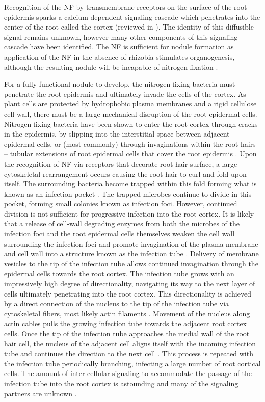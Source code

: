Recognition of the NF by transmembrane receptors on the surface of
the root epidermis sparks a calcium-dependent signaling cascade which penetrates
into the center of the root called the cortex (reviewed in
\citet{Oldroyd:2004dv, Oldroyd:2008hd}). The identity of this diffusible signal
remains unknown, however many other components of this signaling cascade have
been identified. The NF is sufficient for
nodule formation as application of the NF in the absence of rhizobia stimulates
organogenesis, although the resulting nodule will be incapable of nitrogen
fixation \cite{Truchet:1991tu}. 

For a fully-functional nodule to develop, the nitrogen-fixing bacteria 
must penetrate the root epidermis and ultimately invade the cells of the cortex.
As plant cells are protected by hydrophobic plasma membranes and a rigid
cellulose cell wall, there must be a large mechanical disruption of the root
epidermal cells. Nitrogen-fixing bacteria have been shown to enter the root
cortex through cracks in the epidermis, by slipping into the interstitial space
between adjacent epidermal cells, or (most commonly) through invaginations
within the root hairs -- tubular extensions of root epidermal cells that cover the
root
epidermis \cite{Oldroyd:2011ej, Gage:2004ee, Grierson:2002jf}. Upon the
recognition of NF via receptors that decorate root hair surface, a
large cytoskeletal rearrangement occurs causing the root hair to curl and fold upon
itself. The surrounding bacteria become trapped within this fold
forming what is known as an infection pocket \cite{Geurts:2005jx}. The trapped
microbes continue to divide in this pocket, forming small colonies known as
infection foci. However, continued division is not sufficient for
progressive infection into the root cortex. It is likely that a release of
cell-wall degrading enzymes from both the microbes of the infection foci and the
root epidermal cells themselves weaken the cell wall surrounding the infection
foci and
promote invagination of the plasma membrane and cell wall into a structure known as the
infection tube \cite{Ridge:1985wo}. Delivery of membrane vesicles to the tip of
the infection tube allows continued invagination through the epidermal cells
towards the root cortex. The
infection tube grows with an impressively high degree of directionality,
navigating its way to the next
layer of cells ultimately penetrating into the root cortex. This directionality
is achieved by a direct connection of the nucleus to the tip of the infection tube
via cytoskeletal fibers, most likely actin filaments
\cite{MonahanGiovanelli:2006ki}. Movement of the nucleus along actin
cables pulls the growing infection tube towards the adjacent root cortex cells.
Once the tip of the infection tube approaches the medial wall of the root hair
cell, the nucleus of the adjacent cell aligns itself with the incoming infection
tube and continues the direction to
the next cell \cite{Gage:2004ee}. This process is repeated with the infection
tube periodically branching, infecting a large number of root cortical cells.
The amount of inter-cellular signaling to accommodate the passage of the
infection tube into the root cortex is astounding and many of the signaling
partners are unknown \cite{Oldroyd:2011ej}.

